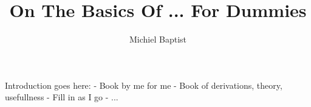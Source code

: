 \documentclass{book}
\author{Michiel Baptist}
\title{On The Basics Of ... For Dummies}
\theoremstyle{plain}
\theoremstyle{definition}
\begin{document}
	\maketitle
	Introduction goes here:
		- Book by me for me
		- Book of derivations, theory, usefullness
		- Fill in as I go
		- ...
	\tableofcontents
	
	
	
	
	
\end{document}
